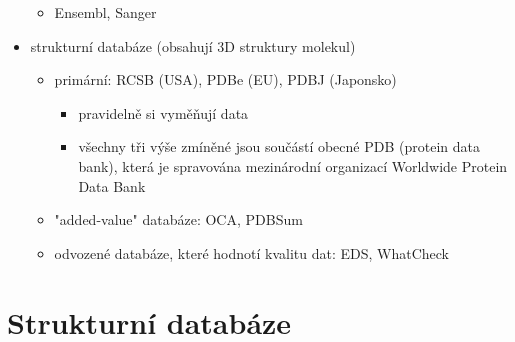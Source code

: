\documentclass[DIV=8]{scrreprt}
\begin{document}
\begin{itemize}[nosep]
\begin{itemize}[nosep]
    \item Ensembl, Sanger
\end{itemize}

    \item strukturní databáze (obsahují 3D struktury molekul)
\begin{itemize}[nosep]
    \item primární: RCSB (USA), PDBe (EU), PDBJ (Japonsko)
\begin{itemize}[nosep]
    \item pravidelně si vyměňují data
    \item všechny tři výše zmíněné jsou součástí obecné PDB (protein data bank), která je spravována mezinárodní organizací Worldwide Protein Data Bank
\end{itemize}

    \item "added-value" databáze: OCA, PDBSum
    \item odvozené databáze, které hodnotí kvalitu dat: EDS, WhatCheck
\end{itemize}

\end{itemize}



\section{Strukturní databáze} \label{Strukturní databáze}
\end{document}
